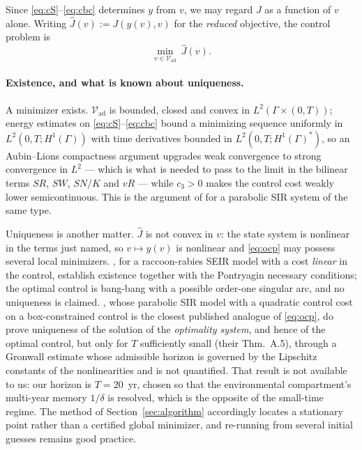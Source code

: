 \documentclass[11pt]{article}
\newcommand{\Vad}{\mathcal{V}_{\mathrm{ad}}}
\begin{document}
Since \eqref{eq:cS}--\eqref{eq:cbc} determines $y$ from $v$, we may regard $J$ as a function of $v$ alone. Writing $\hat J(v) := J(y(v),v)$ for the \emph{reduced} objective, the control problem is
\begin{equation}
\min_{v\in\Vad}\ \hat J(v).
\label{eq:ocp}
\end{equation}

\paragraph{Existence, and what is known about uniqueness.} A minimizer exists. $\Vad$ is bounded, closed and convex in $L^2(\Gamma\times(0,T))$; energy estimates on \eqref{eq:cS}--\eqref{eq:cbc} bound a minimizing sequence uniformly in $L^2(0,T;H^1(\Gamma))$ with time derivatives bounded in $L^2(0,T;H^1(\Gamma)^*)$, so an Aubin--Lions compactness argument upgrades weak convergence to strong convergence in $L^2$ --- which is what is needed to pass to the limit in the bilinear terms $SR$, $SW$, $SN/K$ and $vR$ --- while $c_3>0$ makes the control cost weakly lower semicontinuous. This is the argument of \citet[Thm.~A.2]{Neilan2011} for a parabolic SIR system of the same type.

Uniqueness is another matter. $\hat J$ is not convex in $v$: the state system is nonlinear in the terms just named, so $v\mapsto y(v)$ is nonlinear and \eqref{eq:ocp} may possess several local minimizers. \citet{Clayton2010}, for a raccoon-rabies SEIR model with a cost \emph{linear} in the control, establish existence together with the Pontryagin necessary conditions; the optimal control is bang-bang with a possible order-one singular arc, and no uniqueness is claimed. \citet{Neilan2011}, whose parabolic SIR model with a quadratic control cost on a box-constrained control is the closest published analogue of \eqref{eq:ocp}, do prove uniqueness of the solution of the \emph{optimality system}, and hence of the optimal control, but only for $T$ sufficiently small (their Thm.~A.5), through a Gronwall estimate whose admissible horizon is governed by the Lipschitz constants of the nonlinearities and is not quantified. That result is not available to us: our horizon is $T=20$~yr, chosen so that the environmental compartment's multi-year memory $1/\delta$ is resolved, which is the opposite of the small-time regime. The method of Section~\ref{sec:algorithm} accordingly locates a stationary point rather than a certified global minimizer, and re-running from several initial guesses remains good practice.
\end{document}
